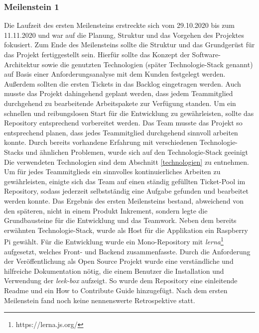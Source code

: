 \documentclass[10pt, a4paper]{article}
\begin{document}
\subsubsection*{Meilenstein 1}
Die Laufzeit des ersten Meilensteins erstreckte sich vom 29.10.2020 bis zum 11.11.2020 und war auf die Planung, Struktur und das Vorgehen des Projektes fokusiert.
Zum Ende des Meilensteins sollte die Struktur und das Grundgerüst für das Projekt fertiggestellt sein.
Hierfür sollte das Konzept der Software-Architektur sowie die genutzten Technologien (später Technologie-Stack genannt) auf Basis einer Anforderungsanalyse mit dem Kunden festgelegt werden.
Außerdem sollten die ersten Tickets in das Backlog eingetragen werden.
Auch musste das Projekt dahingehend geplant werden, dass jedem Teammitglied durchgehend zu bearbeitende Arbeitspakete zur Verfügung standen.
Um ein schnellen und reibungslosen Start für die Entwicklung zu gewährleisten, sollte das Repository entsprechend vorbereitet werden.
Das Team musste das Projekt so entsprechend planen, dass jedes Teammitglied durchgehend sinnvoll arbeiten konnte.
Durch bereits vorhandene Erfahrung mit verschiedenen Technologie-Stacks und ähnlichen Problemen, wurde sich auf den Technologie-Stack geeinigt
Die verwendeten Technologien sind dem Abschnitt \ref{technologien} zu entnehmen.
Um für jedes Teammitglieds ein sinnvolles kontinuierliches Arbeiten zu gewährleisten, einigte sich das Team auf einen ständig gefüllten Ticket-Pool im Repository, sodass jederzeit selbstständig eine Aufgabe gefunden und bearbeitet werden konnte.
Das Ergebnis des ersten Meilensteins bestand, abweichend von den späteren, nicht in einem Produkt Inkrement, sondern legte die Grundbausteine für die Entwicklung und das Teamwork.
Neben dem bereits erwähnten Technologie-Stack, wurde als Host für die Applikation ein Raspberry Pi gewählt.
Für die Entwicklung wurde ein Mono-Repository mit \textit{lerna}\footnote{https://lerna.js.org/} aufgesetzt, welches Front- und Backend zusammenfasste.
Durch die Anforderung der Veröffentlichung als Open Source Projekt wurde eine verständliche und hilfreiche Dokumentation nötig, die einem Benutzer die Installation und Verwendung der \textit{leek-box} aufzeigt.
So wurde dem Repository eine einleitende Readme und ein \glqq How to Contribute\grqq{} Guide hinzugefügt.
Nach dem ersten Meilenstein fand noch keine nennenswerte Retrospektive statt.
\end{document}
